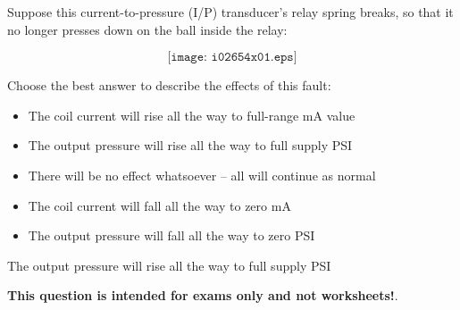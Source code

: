 

Suppose this current-to-pressure (I/P) transducer's relay spring breaks, so that it no longer presses down on the ball inside the relay:

$$\texttt{[image: i02654x01.eps]}$$

\noindent
Choose the best answer to describe the effects of this fault:

\begin{itemize}
\item{} The coil current will rise all the way to full-range mA value
\vskip 10pt
\item{} The output pressure will rise all the way to full supply PSI 
\vskip 10pt
\item{} There will be no effect whatsoever -- all will continue as normal
\vskip 10pt
\item{} The coil current will fall all the way to zero mA 
\vskip 10pt
\item{} The output pressure will fall all the way to zero PSI
\end{itemize}







The output pressure will rise all the way to full supply PSI 







{\bf This question is intended for exams only and not worksheets!}.



